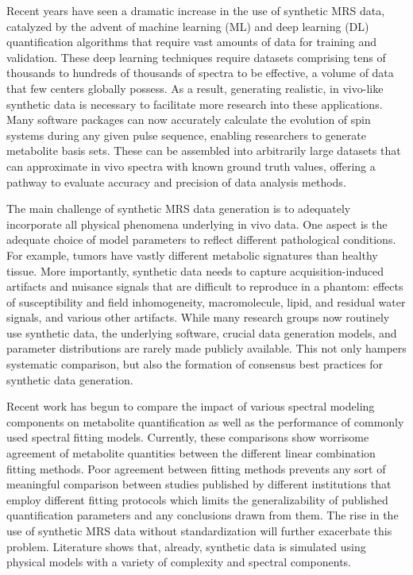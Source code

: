 Recent years have seen a dramatic increase in the use of synthetic MRS data, catalyzed by the advent of machine learning\cite{Das2017} (ML) and deep learning\cite{Gurbani2019, Hatami, Lee2019} (DL) quantification algorithms that require vast amounts of data for training and validation. These deep learning techniques require datasets comprising tens of thousands to hundreds of thousands of spectra to be effective, a volume of data that few centers globally possess. As a result, generating realistic, in vivo-like synthetic data is necessary to facilitate more research into these applications. Many software packages\cite{Hogben2011, Landheer2021, Simpson2017,Smith1994, Soher2011, Stefan2009, Tal2020} can now accurately calculate the evolution of spin systems during any given pulse sequence, enabling researchers to generate metabolite basis sets. These can be assembled into arbitrarily large datasets that can approximate in vivo spectra with known ground truth values, offering a pathway to evaluate accuracy and precision of data analysis methods.
 
The main challenge of synthetic MRS data generation is to adequately incorporate all physical phenomena underlying in vivo data. One aspect is the adequate choice of model parameters to reflect different pathological conditions. For example, tumors have vastly different metabolic signatures than healthy tissue. More importantly, synthetic data needs to capture acquisition-induced artifacts and nuisance signals that are difficult to reproduce in a phantom: effects of susceptibility and field inhomogeneity, macromolecule, lipid, and residual water signals, and various other artifacts. While many research groups now routinely use synthetic data, the underlying software, crucial data generation models, and parameter distributions are rarely made publicly available. This not only hampers systematic comparison, but also the formation of consensus best practices for synthetic data generation.
 
Recent work has begun to compare the impact of various spectral modeling components on metabolite quantification as well as the performance of commonly used spectral fitting models.\cite{Craven2022,Marjanska2021,Marjanska2022,Zollner2021} Currently, these comparisons show worrisome agreement of metabolite quantities between the different linear combination fitting methods. Poor agreement between fitting methods prevents any sort of meaningful comparison between studies published by different institutions that employ different fitting protocols which limits the generalizability of published quantification parameters and any conclusions drawn from them. The rise in the use of synthetic MRS data without standardization will further exacerbate this problem. Literature shows that, already, synthetic data is simulated using physical models with a variety of complexity and spectral components.\cite{Hatami,Das2018a,Das2018,Iqbal2018a}
 
